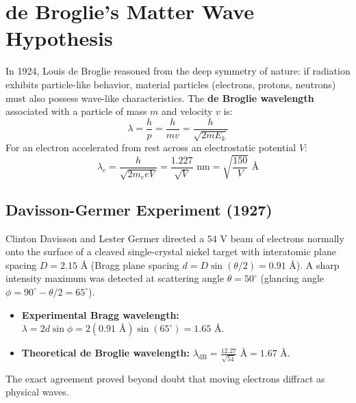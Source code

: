 \section{de Broglie's Matter Wave Hypothesis}
In 1924, Louis de Broglie reasoned from the deep symmetry of nature: if radiation exhibits particle-like behavior, material particles (electrons, protons, neutrons) must also possess wave-like characteristics. The \textbf{de Broglie wavelength} associated with a particle of mass $m$ and velocity $v$ is:
\begin{equation}
\lambda = \frac{h}{p} = \frac{h}{m v} = \frac{h}{\sqrt{2m E_k}}
\end{equation}
For an electron accelerated from rest across an electrostatic potential $V$:
\begin{equation}
\lambda_e = \frac{h}{\sqrt{2m_e e V}} = \frac{1.227}{\sqrt{V}}\text{ nm} = \sqrt{\frac{150}{V}}\text{ \AA}
\end{equation}

\subsection{Davisson-Germer Experiment (1927)}
Clinton Davisson and Lester Germer directed a $54\text{ V}$ beam of electrons normally onto the surface of a cleaved single-crystal nickel target with interatomic plane spacing $D = 2.15\text{ \AA}$ (Bragg plane spacing $d = D\sin(\theta/2) = 0.91\text{ \AA}$). A sharp intensity maximum was detected at scattering angle $\theta = 50^\circ$ (glancing angle $\phi = 90^\circ - \theta/2 = 65^\circ$).
\begin{itemize}
    \item \textbf{Experimental Bragg wavelength:} $\lambda = 2d\sin\phi = 2(0.91\text{ \AA})\sin(65^\circ) = 1.65\text{ \AA}$.
    \item \textbf{Theoretical de Broglie wavelength:} $\lambda_{\text{dB}} = \frac{12.27}{\sqrt{54}}\text{ \AA} = 1.67\text{ \AA}$.
\end{itemize}
The exact agreement proved beyond doubt that moving electrons diffract as physical waves.

